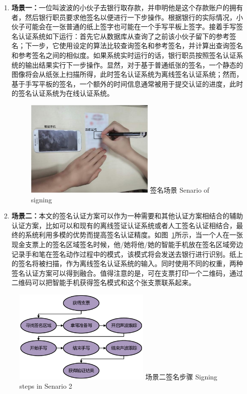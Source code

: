 \begin{enumerate}[label=(\arabic*)]
\item \textbf{场景一：}一位叫波波的小伙子去银行取存款，并申明他是这个存款账户的拥有者，然后银行职员要求他签名以便进行一下步操作。根据银行的实际情况，小伙子可能会在一张普通的纸上签字也可能在一个手写平板上签字。接着手写签名认证系统如下运行：首先它从数据库从查询了之前该小伙子留下的参考签名；下一步，它使用设定的算法比较查询签名和参考签名，并计算出查询签名和参考签名之间的相似度。如果系统实时运行的话，银行职员按照签名认证系统的输出结果实行下一步操作。显然，对于基于普通纸张的签名，一个静态的图像将会从纸张上扫描所得，此时签名认证系统为离线签名认证系统；然而，基于手写平板的签名，一个额外的时间信息通常被用于提交认证的进度，此时的签名认证系统为在线认证系统。

\begin{figure}[!htp]
  \centering
  \includegraphics[width=0.6\textwidth]{figure/acoustic-senario.pdf}
  \bicaption
    {签名场景}
    {Senario of signing}
  \label{fig:sign-senario}
\end{figure}

\item  \textbf{场景二：}本文的签名认证方案可以作为一种需要和其他认证方案相结合的辅助认证方案，比如可以和现有的离线签证认证系统或者人工签名认证相结合，最终的系统利用多模的优势而提高签名认证精度。如图~\ref{fig:sign-senario}所示，当一个人在一张现金支票上的签名区域签名时候，他/她将他/她的智能手机放在签名区域旁边记录手和笔在签名动作过程中的模式，该模式将会发送去银行进行识别。纸上的签名将被扫描，作为离线签名认证系统的输入。同时使用不同的权重，两种签名认证方案可以得到融合。值得注意的是，可在支票打印一个二维码，通过二维码可以把智能手机获得签名模式和这个张支票联系起来。
\end{enumerate}

\begin{figure}[!htp]
  \centering
  \includegraphics[width=0.6\textwidth]{figure/senario-actions}
  \bicaption
    {场景二签名步骤}
    {Signing steps in Senario 2}
  \label{fig:signing-steps}
\end{figure}

